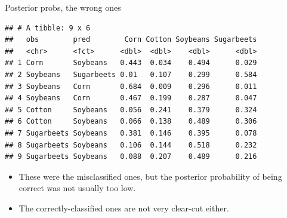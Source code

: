 \documentclass[
  ignorenonframetext,
]{beamer}
\newenvironment{Shaded}{\begin{snugshade}}{\end{snugshade}}
\newcommand{\DataTypeTok}[1]{\textcolor[rgb]{0.13,0.29,0.53}{#1}}
\newcommand{\DecValTok}[1]{\textcolor[rgb]{0.00,0.00,0.81}{#1}}
\newcommand{\KeywordTok}[1]{\textcolor[rgb]{0.13,0.29,0.53}{\textbf{#1}}}
\newcommand{\NormalTok}[1]{#1}
\newcommand{\OperatorTok}[1]{\textcolor[rgb]{0.81,0.36,0.00}{\textbf{#1}}}
\newcommand{\StringTok}[1]{\textcolor[rgb]{0.31,0.60,0.02}{#1}}
\begin{document}
\begin{frame}[fragile]{Posterior probs, the wrong ones}
\protect\hypertarget{posterior-probs-the-wrong-ones}{}

\footnotesize

\begin{Shaded}
\end{Shaded}

\begin{verbatim}
## # A tibble: 9 x 6
##   obs        pred        Corn Cotton Soybeans Sugarbeets
##   <chr>      <fct>      <dbl>  <dbl>    <dbl>      <dbl>
## 1 Corn       Soybeans   0.443  0.034    0.494      0.029
## 2 Soybeans   Sugarbeets 0.01   0.107    0.299      0.584
## 3 Soybeans   Corn       0.684  0.009    0.296      0.011
## 4 Soybeans   Corn       0.467  0.199    0.287      0.047
## 5 Cotton     Soybeans   0.056  0.241    0.379      0.324
## 6 Cotton     Soybeans   0.066  0.138    0.489      0.306
## 7 Sugarbeets Soybeans   0.381  0.146    0.395      0.078
## 8 Sugarbeets Soybeans   0.106  0.144    0.518      0.232
## 9 Sugarbeets Soybeans   0.088  0.207    0.489      0.216
\end{verbatim}

\normalsize

\begin{itemize}
\item
  These were the misclassified ones, but the posterior probability of
  being correct was not usually too low.
\item
  The correctly-classified ones are not very clear-cut either.
\end{itemize}

\end{frame}
\end{document}
